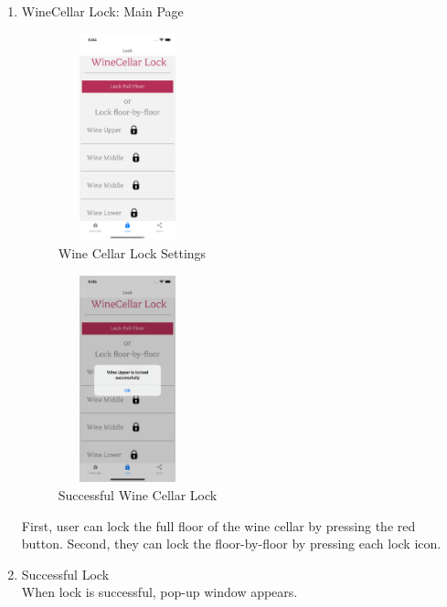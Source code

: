 \documentclass[sigconf, nonacm]{acmart}
\begin{document}
\begin {enumerate}
\begin{enumerate}
\begin{enumerate}
\begin{enumerate}
                \item WineCellar Lock: Main Page
                \begin{figure}
                    \centering
                    \includegraphics[width=4cm, height=6cm]{5. ViewingCellarTrytoLock.png}
                    \caption{Wine Cellar Lock Settings}
                \end{figure}
                \begin{figure}
                    \centering
                    \includegraphics[width=4cm, height=6cm]{6.PartiallyLoced.png}
                    \caption{Successful Wine Cellar Lock}
                \end{figure}
                 
                First, user can lock the full floor of the wine cellar by pressing the red button. Second, they can lock the floor-by-floor by pressing each lock icon.  
                \item Successful Lock\\
                When lock is successful, pop-up window appears. 
            \end{enumerate}
        \end{enumerate}
    \end{enumerate}
\end{enumerate}
\end{document}
